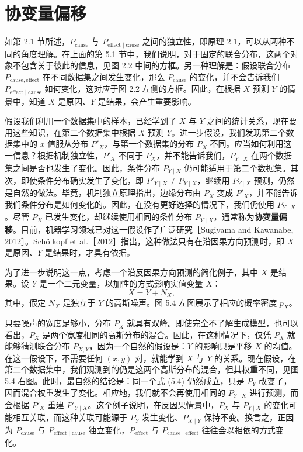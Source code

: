 \section{协变量偏移}
\label{sec:ch05-covariate-shift}

如第 2.1 节所述，$P_{\mathrm{cause}}$ 与 $P_{\mathrm{effect}\mid\mathrm{cause}}$ 之间的独立性，即原理 2.1，可以从两种不同的角度理解。在上面的第 5.1 节中，我们说明，对于固定的联合分布，这两个对象不包含关于彼此的信息，见图 2.2 中间的方框。另一种理解是：假设联合分布 $P_{\mathrm{cause},\mathrm{effect}}$ 在不同数据集之间发生变化，那么 $P_{\mathrm{cause}}$ 的变化，并不会告诉我们 $P_{\mathrm{effect}\mid\mathrm{cause}}$ 如何变化，这对应于图 2.2 左侧的方框。因此，在根据 $X$ 预测 $Y$ 的情景中，知道 $X$ 是原因、$Y$ 是结果，会产生重要影响。

假设我们利用一个数据集中的样本，已经学到了 $X$ 与 $Y$ 之间的统计关系，现在要用这些知识，在第二个数据集中根据 $X$ 预测 $Y$。进一步假设，我们发现第二个数据集中的 $x$ 值服从分布 $P'_X$，与第一个数据集的分布 $P_X$ 不同。应当如何利用这一信息？根据机制独立性，$P'_X$ 不同于 $P_X$，并不能告诉我们，$P_{Y\mid X}$ 在两个数据集之间是否也发生了变化。因此，条件分布 $P_{Y\mid X}$ 仍可能适用于第二个数据集。其次，即使条件分布确实发生了变化，即 $P'_{Y\mid X}\neq P_{Y\mid X}$，继续用 $P_{Y\mid X}$ 预测，仍然是自然的做法。毕竟，机制独立原理指出，边缘分布由 $P_X$ 变成 $P'_X$，并不能告诉我们条件分布是如何变化的。因此，在没有更好选择的情况下，我们仍使用 $P_{Y\mid X}$。尽管 $P_X$ 已发生变化，却继续使用相同的条件分布 $P_{Y\mid X}$，通常称为\textbf{协变量偏移}。目前，机器学习领域已对这一假设作了广泛研究［Sugiyama and Kawanabe, 2012］。Schölkopf et al.［2012］指出，这种做法只有在沿因果方向预测时，即 $X$ 是原因、$Y$ 是结果时，才具有依据。

为了进一步说明这一点，考虑一个沿反因果方向预测的简化例子，其中 $X$ 是结果。设 $Y$ 是一个二元变量，以加性的方式影响实值变量 $X$：
\begin{equation}
 X=Y+N_X,
 \tag{5.4}
\end{equation}
其中，假定 $N_X$ 是独立于 $Y$ 的高斯噪声。图 5.4 左图展示了相应的概率密度 $p_X$。



只要噪声的宽度足够小，分布 $P_X$ 就具有双峰。即使完全不了解生成模型，也可以看出，$P_X$ 是两个宽度相同的高斯分布的混合。因此，在这种情况下，仅凭 $P_X$ 就能够猜测联合分布 $P_{X,Y}$，因为一个自然的假设是：$Y$ 的影响只是平移 $X$ 的均值。在这一假设下，不需要任何 $(x,y)$ 对，就能学到 $X$ 与 $Y$ 的关系。现在假设，在第二个数据集中，我们观测到的仍是这两个高斯分布的混合，但其权重不同，见图 5.4 右图。此时，最自然的结论是：同一个式 (5.4) 仍然成立，只是 $P_Y$ 改变了，因而混合权重发生了变化。相应地，我们就不会再使用相同的 $P_{Y\mid X}$ 进行预测，而会根据 $P'_X$ 重建 $P'_{Y\mid X}$。这个例子说明，在反因果情景中，$P_X$ 与 $P_{Y\mid X}$ 的变化可能相互关联，而这种关联可能源于 $P_Y$ 发生变化、$P_{X\mid Y}$ 保持不变。换言之，正因为 $P_{\mathrm{cause}}$ 与 $P_{\mathrm{effect}\mid\mathrm{cause}}$ 独立变化，$P_{\mathrm{effect}}$ 与 $P_{\mathrm{cause}\mid\mathrm{effect}}$ 往往会以相依的方式变化。

